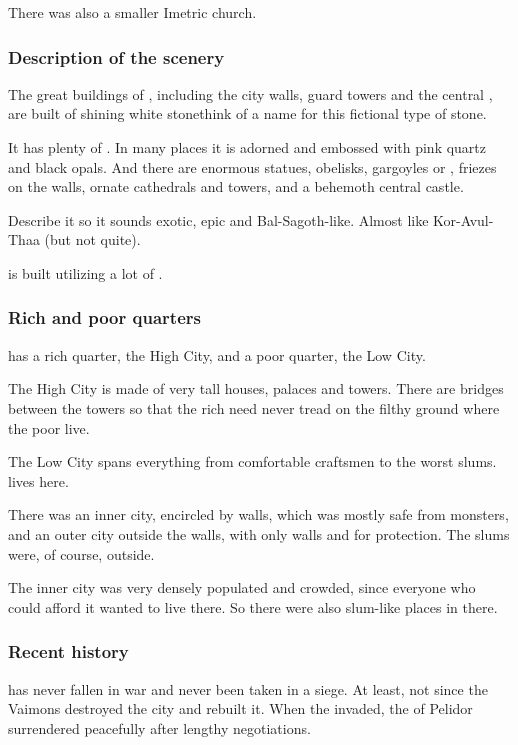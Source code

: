 There was also a smaller Imetric church. 





\subsubsection{Description of the scenery}
The great buildings of \Malcur, including the city walls, guard towers and the central \CastlePelidor, are built of shining white stone\dash think of a name for this fictional type of stone. 

It has plenty of . 
In many places it is adorned and embossed with pink quartz and black opals. And there are enormous statues, obelisks, gargoyles or , friezes on the walls, ornate cathedrals and towers, and a behemoth central castle.

Describe it so it sounds exotic, epic and Bal-Sagoth-like. Almost like Kor-Avul-Thaa (but not quite).

\Malcur is built utilizing a lot of . 





\subsubsection{Rich and poor quarters}
\Malcur has a rich quarter, the High City, and a poor quarter, the Low City. 

The High City is made of very tall houses, palaces and towers. There are bridges between the towers so that the rich need never tread on the filthy ground where the poor live. 

The Low City spans everything from comfortable craftsmen to the worst slums.  lives here.

There was an inner city, encircled by walls, which was mostly safe from monsters, and an outer city outside the walls, with only walls and \eidola for protection.
The slums were, of course, outside.

The inner city was very densely populated and crowded, since everyone who could afford it wanted to live there.
So there were also slum-like places in there. 





\subsubsection{Recent history}
\Malcur has never fallen in war and never been taken in a siege. At least, not since the Vaimons destroyed the city and rebuilt it. When the \Velcadians{} invaded, the \rayuth of Pelidor surrendered peacefully after lengthy negotiations. 





